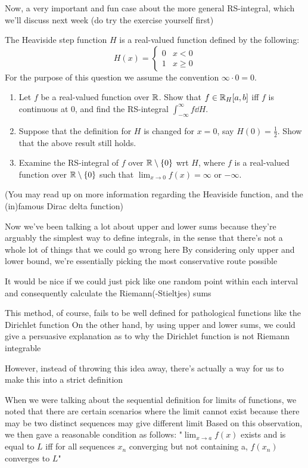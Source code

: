 Now, a very important and fun case about the more general RS-integral, which we'll discuss next week (do try the exercise yourself first)

\begin{exercise}
The Heaviside step function $H$ is a real-valued function defined by the following:
\[ H(x)=\begin{cases}
0 & x<0 \\
1 & x\ge0
\end{cases} \]
For the purpose of this question we assume the convention $\infty\cdot0=0$.
\begin{enumerate}[label=(\alph*)]
\item Let $f$ be a real-valued function over $\mathbb R$. Show that $f\in\mathbb R_H [a,b]$ iff $f$ is continuous at $0$, and find the RS-integral $\int_{-\infty}^\infty f\dd{H}$.
\item Suppose that the definition for $H$ is changed for $x=0$, say $H(0)=\frac{1}{2}$. Show that the above result still holds.
\item Examine the RS-integral of $f$ over $\mathbb R\setminus\{0\}$ wrt $H$, where $f$ is a real-valued function over $\mathbb R\setminus\{0\}$ such that $\lim_{x\to0}f(x)=\infty$ or $-\infty$.
\end{enumerate}
(You may read up on more information regarding the Heaviside function, and the (in)famous Dirac delta function)
\end{exercise}




Now we've been talking a lot about upper and lower sums because they're arguably the simplest way to define integrals, in the sense that there's not a whole lot of things that we could go wrong here
By considering only upper and lower bound, we're essentially picking the most conservative route possible

It would be nice if we could just pick like one random point within each interval and consequently calculate the Riemann(-Stieltjes) sums

This method, of course, fails to be well defined for pathological functions like the Dirichlet function
On the other hand, by using upper and lower sums, we could give a persuasive explanation as to why the Dirichlet function is not Riemann integrable

However, instead of throwing this idea away, there's actually a way for us to make this into a strict definition

When we were talking about the sequential definition for limits of functions, we noted that there are certain scenarios where the limit cannot exist because there may be two distinct sequences may give different limit
Based on this observation, we then gave a reasonable condition as follows:
"$\lim_{x\to a} f(x)$ exists and is equal to $L$ iff for all sequences $x_n$ converging but not containing a, $f(x_n)$ converges to $L$"

